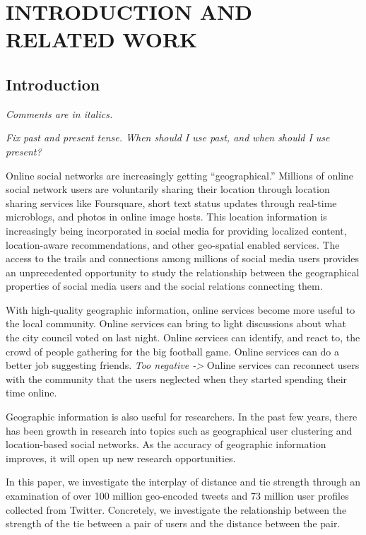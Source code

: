 \ifdefined\THESIS
    \pagestyle{plain} %
    \setcounter{page}{1}
    \chapter{\uppercase {Introduction and Related Work}}
\else
\fi

\section{Introduction}

\emph{Comments are in italics.}

\emph{Fix past and present tense. When should I use past, and when should I use
present?}

Online social networks are increasingly getting ``geographical.''
%
Millions of online social network users are voluntarily sharing their location
through location sharing services like Foursquare, short text status updates
through real-time microblogs, and photos in online image hosts.
%
This location information is increasingly being incorporated in social media
for providing localized content, location-aware recommendations, and other
geo-spatial enabled services.
%
The access to the trails and connections among millions of social media users
provides an unprecedented opportunity to study the relationship between the
geographical properties of social media users and the social relations
connecting them.

With high-quality geographic information, online services become more useful to
the local community.
%
Online services can bring to light discussions about what the city council
voted on last night.
%
Online services can identify, and react to, the crowd of people gathering for
the big football game.
%
Online services can do a better job suggesting friends.
%
\emph{Too negative ->}
Online services can reconnect users with the community that the users neglected
when they started spending their time online.

Geographic information is also useful for researchers.
In the past few years, there has been growth in research into topics such as
geographical user clustering and location-based social networks.
%
As the accuracy of geographic information improves, it will open up new
research opportunities.

In this paper, we investigate the interplay of distance and tie strength
through an examination of over 100 million geo-encoded tweets and 73 million
user profiles collected from Twitter.
%
Concretely, we investigate the relationship between the strength of the tie
between a pair of users and the distance between the pair.
%

